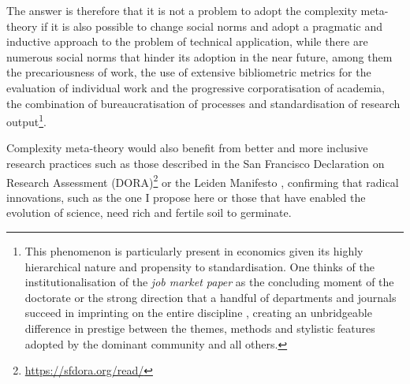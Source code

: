 The answer is therefore that it is not a problem to adopt the complexity meta-theory if it is also possible to change social norms and adopt a pragmatic and inductive approach to the problem of technical application, while there are numerous social norms that hinder its adoption in the near future, among them the precariousness of work, the use of extensive bibliometric metrics for the evaluation of individual work and the progressive corporatisation of academia, the combination of bureaucratisation of processes and standardisation of research output\footnote{This phenomenon is particularly present in economics given its highly hierarchical nature and propensity to standardisation. One thinks of the institutionalisation of the \textit{job market paper} as the concluding moment of the doctorate or the strong direction that a handful of departments and journals succeed in imprinting on the entire discipline \parencite{heckman2020, aistleitner2023, baccini2023a}, creating an unbridgeable difference in prestige between the themes, methods and stylistic features adopted by the dominant community and all others.}.

Complexity meta-theory would also benefit from better and more inclusive research practices such as those described in the San Francisco Declaration on Research Assessment (DORA)\footnote{\url{https://sfdora.org/read/}} or the Leiden Manifesto \parencite{hicks2015}, confirming that radical innovations, such as the one I propose here or those that have enabled the evolution of science, need rich and fertile soil to germinate.
